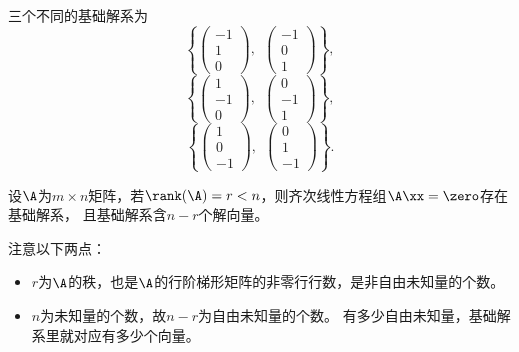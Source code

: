 \begin{jie}
三个不同的基础解系为
$$
\left\{
  \left(
    \begin{array}{r}
      -1\\1\\0
    \end{array}
  \right),~~
  \left(
    \begin{array}{r}
      -1\\0\\1
    \end{array}
  \right)
\right\},
$$
$$
\left\{
  \left(
    \begin{array}{r}
      1\\-1\\0
    \end{array}
  \right),~~
  \left(
    \begin{array}{r}
      0\\-1\\1
    \end{array}
  \right)
\right\},
$$
$$
\left\{
  \left(
    \begin{array}{r}
      1\\0\\-1
    \end{array}
  \right),~~
  \left(
    \begin{array}{r}
      0\\1\\-1
    \end{array}
  \right)
\right\}.
$$
\end{jie}





\begin{dingli}
  设$\A$为$m\times n$矩阵，若$\rank(\A)=r<n$，则齐次线性方程组$\A\xx=\zero$存在基础解系，
  且基础解系含$n-r$个解向量。
\end{dingli}

\begin{zhu}
  注意以下两点：
  \begin{itemize}
  \item $r$为$\A$的秩，也是$\A$的行阶梯形矩阵的非零行行数，是非自由未知量的个数。 
  \item $n$为未知量的个数，故$n-r$为自由未知量的个数。 有多少自由未知量，基础解系里就对应有多少个向量。
  \end{itemize}
\end{zhu}





